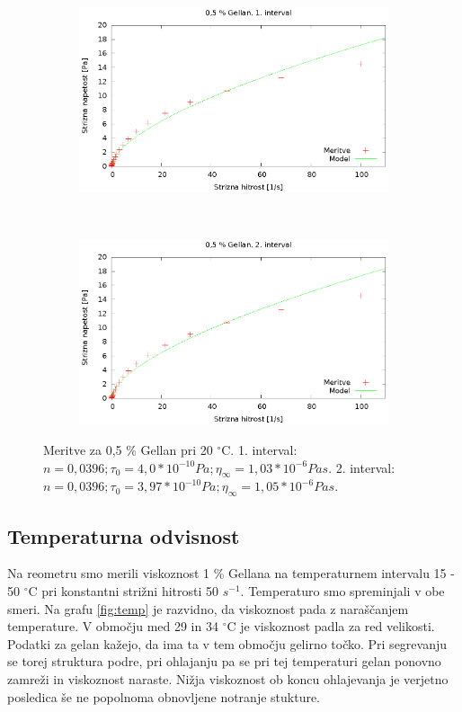 \documentclass{article}
\begin{document}
\begin{figure}[H]
	\centering
	\begin{subfigure}[b]{0.45\textwidth}
	       \includegraphics[width=\textwidth]{tok_gel3.eps}
	   \end{subfigure}
	   ~
	   \begin{subfigure}[b]{0.45\textwidth}
	       \includegraphics[width=\textwidth]{tok_gel4.eps}
	   \end{subfigure}
	\caption{Meritve za 0,5 \% Gellan pri 20 $^\circ$C. 1. interval: $n = 0,0396; \tau_0 = 4,0*10^{-10} Pa; \eta_\infty = 1,03*10^{-6} Pa s$. 2. interval: $n = 0,0396; \tau_0 = 3,97*10^{-10} Pa; \eta_\infty = 1,05*10^{-6} Pa s$.}
	\label{fig:tok_gel2}
\end{figure}

\subsection{Temperaturna odvisnost}

Na reometru smo merili viskoznost 1 \% Gellana na temperaturnem intervalu 15 - 50 $^\circ$C pri konstantni strižni hitrosti 50 $s^{-1}$. Temperaturo smo spreminjali v obe smeri.
Na grafu \ref{fig:temp} je razvidno, da viskoznost pada z naraščanjem temperature. V območju med 29 in 34 $^\circ$C je viskoznost padla za red velikosti. Podatki za gelan kažejo, da ima ta v tem območju gelirno točko. Pri segrevanju se torej struktura podre, pri ohlajanju pa se pri tej temperaturi gelan ponovno zamreži in viskoznost naraste. Nižja viskoznost ob koncu ohlajevanja je verjetno posledica še ne popolnoma obnovljene notranje stukture.
\end{document}

